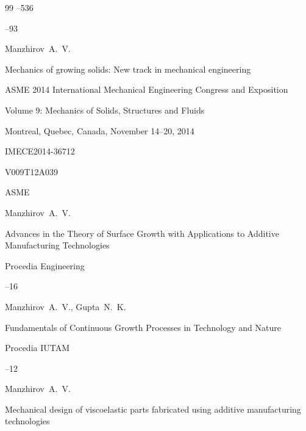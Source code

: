 \begin{thebibliography}{99}
--536

--93





\by Manzhirov~A.~V.

\paper Mechanics of growing solids: New track in mechanical engineering

\inbook ASME 2014 International Mechanical Engineering Congress and Exposition

\bookinfo Volume 9: Mechanics of Solids, Structures and Fluids

\procinfo Montreal, Quebec, Canada, November 14–20, 2014


\papernumber IMECE2014-36712

\pages V009T12A039


\publaddr ASME




\by Manzhirov~A.~V.

\paper Advances in the Theory of Surface Growth with Applications to Additive Manufacturing Technologies

\jour Procedia Engineering



--16





\by Manzhirov~A.~V., Gupta~N.~K.

\paper Fundamentals of Continuous Growth Processes in Technology and Nature

\jour Procedia IUTAM



--12







\by Manzhirov~A.~V.

\paper Mechanical design of viscoelastic parts fabricated using additive manufacturing technologies


\end{thebibliography}
